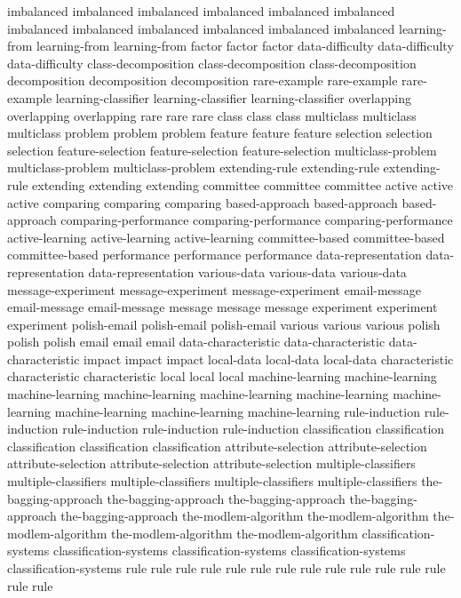 imbalanced	imbalanced	imbalanced	imbalanced	imbalanced	imbalanced	imbalanced	imbalanced	imbalanced	imbalanced	imbalanced	imbalanced	
learning-from	learning-from	learning-from	
factor	factor	factor	
data-difficulty	data-difficulty	data-difficulty	
class-decomposition	class-decomposition	class-decomposition	
decomposition	decomposition	decomposition	
rare-example	rare-example	rare-example	
learning-classifier	learning-classifier	learning-classifier	
overlapping	overlapping	overlapping	
rare	rare	rare	
class	class	class	
multiclass	multiclass	multiclass	
problem	problem	problem	
feature	feature	feature	
selection	selection	selection	
feature-selection	feature-selection	feature-selection	
multiclass-problem	multiclass-problem	multiclass-problem	
extending-rule	extending-rule	extending-rule	
extending	extending	extending	
committee	committee	committee	
active	active	active	
comparing	comparing	comparing	
based-approach	based-approach	based-approach	
comparing-performance	comparing-performance	comparing-performance	
active-learning	active-learning	active-learning	
committee-based	committee-based	committee-based	
performance	performance	performance	
data-representation	data-representation	data-representation	
various-data	various-data	various-data	
message-experiment	message-experiment	message-experiment	
email-message	email-message	email-message	
message	message	message	
experiment	experiment	experiment	
polish-email	polish-email	polish-email	
various	various	various	
polish	polish	polish	
email	email	email	
data-characteristic	data-characteristic	data-characteristic	
impact	impact	impact	
local-data	local-data	local-data	
characteristic	characteristic	characteristic	
local	local	local	
machine-learning	machine-learning	machine-learning	machine-learning	machine-learning	machine-learning	machine-learning	machine-learning	machine-learning	machine-learning	
rule-induction	rule-induction	rule-induction	rule-induction	rule-induction	
classification	classification	classification	classification	classification	
attribute-selection	attribute-selection	attribute-selection	attribute-selection	attribute-selection	
multiple-classifiers	multiple-classifiers	multiple-classifiers	multiple-classifiers	multiple-classifiers	
the-bagging-approach	the-bagging-approach	the-bagging-approach	the-bagging-approach	the-bagging-approach	
the-modlem-algorithm	the-modlem-algorithm	the-modlem-algorithm	the-modlem-algorithm	the-modlem-algorithm	
classification-systems	classification-systems	classification-systems	classification-systems	classification-systems	
rule	rule	rule	rule	rule	rule	rule	rule	rule	rule	rule	rule	rule	rule	rule	
